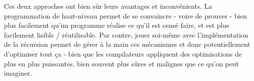 Ces deux approches ont bien sûr leurs avantages et inconvénients. La programmation de haut-niveau permet de se convaincre - voire de prouver - bien plus facilement qu'un programme réalise ce qu'il est censé faire, et est plus facilement lisible / réutilisable. Par contre, jouer soi-même avec l'implémentation de la récursion permet de gérer à la main ces mécanismes et donc potentiellement d'optimiser tout ça - bien que les compilateurs appliquent des optimisations de plus en plus puissantes, bien souvent plus sûres et malignes que ce qu'on peut imaginer. 
